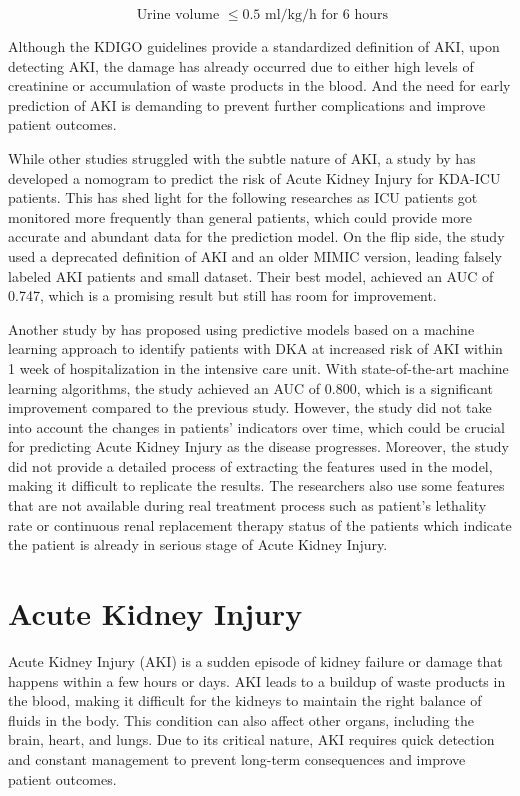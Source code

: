 \documentclass[../main.tex]{subfiles}
\begin{document}
\begin{equation}
    \text{ Urine volume } \le 0.5 \text{ ml/kg/h for 6 hours}
\end{equation}

Although the KDIGO guidelines provide a standardized definition of AKI, upon detecting AKI, the damage has already occurred due to either high levels of creatinine or accumulation of waste products in the blood.
And the need for early prediction of AKI is demanding to prevent further complications and improve patient outcomes.

While other studies struggled with the subtle nature of AKI, a study by \cite{chen2021nomogram} has developed a nomogram to predict the risk of Acute Kidney Injury for KDA-ICU patients.
This has shed light for the following researches as ICU patients got monitored more frequently than general patients, which could provide more accurate and abundant data for the prediction model.
On the flip side, the study used a deprecated definition of AKI and an older MIMIC version, leading falsely labeled AKI patients and small dataset.
Their best model, achieved an AUC of 0.747, which is a promising result but still has room for improvement.

Another study by \cite{goceri2021predicting} has proposed using predictive models based on a machine learning approach to identify patients with DKA at increased risk of AKI within 1 week of hospitalization in the intensive care unit.
With state-of-the-art machine learning algorithms, the study achieved an AUC of 0.800, which is a significant improvement compared to the previous study.
However, the study did not take into account the changes in patients' indicators over time, which could be crucial for predicting Acute Kidney Injury as the disease progresses. 
Moreover, the study did not provide a detailed process of extracting the features used in the model, making it difficult to replicate the results.
The researchers also use some features that are not available during real treatment process such as patient's lethality rate or continuous renal replacement therapy status of the patients which indicate the patient is already in serious stage of Acute Kidney Injury.



\section{Acute Kidney Injury}
Acute Kidney Injury (AKI) is a sudden episode of kidney failure or damage that happens within a few hours or days. 
AKI leads to a buildup of waste products in the blood, making it difficult for the kidneys to maintain the right balance of fluids in the body. 
This condition can also affect other organs, including the brain, heart, and lungs. Due to its critical nature, AKI requires quick detection and constant management to prevent long-term consequences and improve patient outcomes.
\end{document}

